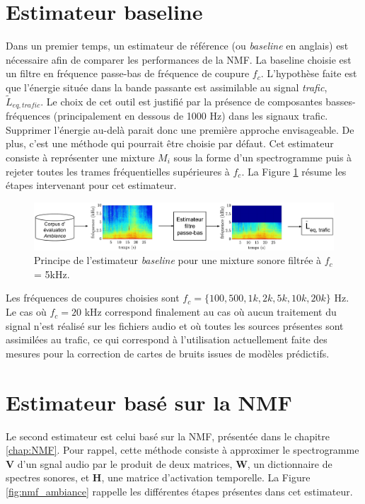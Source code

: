 \section{Estimateur baseline}
Dans un premier temps, un estimateur de référence (ou \textit{baseline} en anglais) est nécessaire afin de comparer les performances de la NMF. La baseline choisie est un filtre en fréquence passe-bas de fréquence de coupure $f_c$. L'hypothèse faite est que l'énergie située dans la bande passante est assimilable au signal \textit{trafic}, $\tilde{L}_{eq,trafic}$. Le choix de cet outil est justifié par la présence de composantes basses-fréquences (principalement en dessous de 1000 Hz) dans les signaux trafic. Supprimer l'énergie au-delà parait donc une première approche envisageable. De plus, c'est une méthode qui pourrait être choisie par défaut.
Cet estimateur consiste à représenter une mixture $M_i$ sous la forme d'un spectrogramme puis à rejeter toutes les trames fréquentielles supérieures à $f_c$. La Figure \ref{fig:baseline} résume les étapes intervenant pour cet estimateur.

\begin{figure}[hbtp]
\centering
\includegraphics[width=\linewidth]{./figures/NMF/filtre_principe.pdf}
\caption{Principe de l'estimateur \textit{baseline}  pour une mixture sonore filtrée à $f_c$ = 5kHz.}
\label{fig:baseline}
\end{figure}

Les fréquences de coupures choisies sont $f_c = \lbrace 100, 500, 1k, 2k, 5k, 10k, 20k \rbrace$ Hz. Le cas où $f_c = 20$ kHz correspond finalement au cas où aucun traitement du signal n'est réalisé sur les fichiers audio et où toutes les sources présentes sont assimilées au trafic, ce qui correspond à l'utilisation actuellement faite des mesures pour la correction de cartes de bruits issues de modèles prédictifs.

\section{Estimateur basé sur la NMF}
Le second estimateur est celui basé sur la NMF, présentée dans le chapitre \ref{chap:NMF}. Pour rappel, cette méthode consiste à approximer le spectrogramme $\mathbf{V}$ d'un sgnal audio par le produit de deux matrices, $\mathbf{W}$, un dictionnaire de spectres sonores, et $\mathbf{H}$, une matrice d'activation temporelle. La Figure \ref{fig:nmf_ambiance} rappelle les différentes étapes présentes dans cet estimateur.

